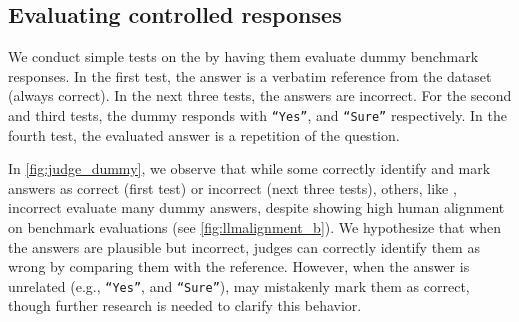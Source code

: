 \subsection{Evaluating controlled responses}
\label{sec:analysis:subsec:judge-ability}

We conduct simple tests on the \judgemodels by having them evaluate dummy benchmark responses. In the first test, the answer is a verbatim reference from the dataset (always correct). In the next three tests, the answers are incorrect. For the second and third tests, the dummy \evaluatormodel responds with \texttt{``Yes''}, and \texttt{``Sure''} respectively. In the fourth test, the evaluated answer is a repetition of the question.


%

In \cref{fig:judge_dummy}, we observe that while some \judgemodels correctly identify and mark answers as correct (first test) or incorrect (next three tests), others, like , incorrect evaluate many dummy answers, despite showing high human alignment on benchmark evaluations (see \cref{fig:llmalignment_b}). We hypothesize that when the answers are plausible but incorrect, judges can correctly identify them as wrong by comparing them with the reference. However, when the answer is unrelated (e.g., \texttt{``Yes''}, and \texttt{``Sure''}), \judgemodels may mistakenly mark them as correct, though further research is needed to clarify this behavior.

